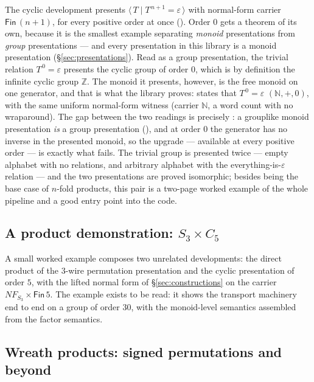 The cyclic development presents $\langle\, T \mid T^{\,n+1} =
\varepsilon\,\rangle$ with normal-form carrier $\mathsf{Fin}\,(n{+}1)$,
for every positive order at once ().  Order
$0$ gets a theorem of its own, because it is the smallest example
separating \emph{monoid} presentations from \emph{group} presentations
--- and every presentation in this library is a monoid presentation
(\S\ref{sec:presentations}).  Read as a group presentation, the
trivial relation $T^{\,0} = \varepsilon$ presents the cyclic group of
order $0$, which is by definition the infinite cyclic group
$\mathbb{Z}$.  The monoid it presents, however, is the free monoid on
one generator, and that is what the library proves:
 states that $T^{\,0} = \varepsilon$
 $(\mathbb{N}, +, 0)$, with the same
uniform normal-form witness (carrier $\mathbb{N}$, a word count with
no wraparound).  The gap between the two readings is precisely
: a grouplike monoid presentation \emph{is} a group
presentation (), and at
order $0$ the generator has no inverse in the presented monoid, so the
upgrade --- available at every positive order --- is exactly what
fails.  The
trivial group is presented twice --- empty alphabet with no relations, and
arbitrary alphabet with the everything-is-$\varepsilon$ relation --- and
the two presentations are proved isomorphic; besides being the base case
of $n$-fold products, this pair is a two-page worked example of the whole
pipeline and a good entry point into the code.

\subsection{A product demonstration: $S_3 \times C_5$}

A small worked example composes two unrelated developments: the direct
product of the $3$-wire permutation presentation and the cyclic
presentation of order $5$, with the lifted normal form of
\S\ref{sec:constructions} on the carrier $\mathit{NF}_{S_3} \times
\mathsf{Fin}\,5$.  The example exists to be read: it shows the transport
machinery end to end on a group of order $30$, with the monoid-level
semantics assembled from the factor semantics. 

\subsection{Wreath products: signed permutations and beyond}

